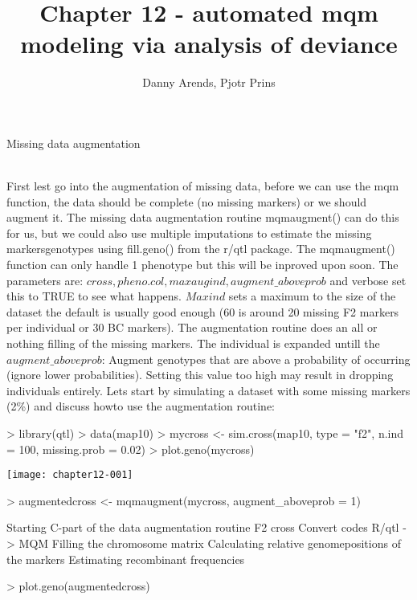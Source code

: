 \documentclass[a4paper]{article}
\title { Chapter 12 - automated mqm modeling via analysis of deviance }
\author { Danny Arends, Pjotr Prins }
\begin{document}
\maketitle
\clearpage
\begin{Large} Missing data augmentation \end{Large}\\
First lest go into the augmentation of missing data, before we can use the mqm function, the data should be complete (no missing markers)
or we should augment it. The missing data augmentation routine mqmaugment() can do this for us, but we could also use multiple imputations
to estimate the missing markersgenotypes using fill.geno() from the r/qtl package. The mqmaugment() function can only handle 1 phenotype but this will be inproved upon soon. The parameters are:
$cross, pheno.col, maxaugind, augment\_aboveprob$ and verbose set this to TRUE to see what happens. $Maxind$ sets a maximum to the size of the dataset the default is usually good enough (60 is around 20 missing F2 markers per individual or 30 BC markers). The augmentation routine does an all or nothing filling of the missing markers. The individual is expanded untill the $augment\_aboveprob$: Augment genotypes that are above a probability of occurring (ignore lower probabilities). Setting this value too high may result in dropping individuals entirely.
Lets start by simulating a dataset with some missing markers (2\%) and discuss howto use the augmentation routine:
\\
\begin{Schunk}
\begin{Sinput}
> library(qtl)
> data(map10)
> mycross <- sim.cross(map10, type = "f2", n.ind = 100, missing.prob = 0.02)
> plot.geno(mycross)
\end{Sinput}
\end{Schunk}
\texttt{[image: chapter12-001]}
\begin{Schunk}
\begin{Sinput}
> augmentedcross <- mqmaugment(mycross, augment_aboveprob = 1)
\end{Sinput}
\begin{Soutput}
Starting C-part of the data augmentation routine
F2 cross
Convert codes R/qtl -> MQM
Filling the chromosome matrix
Calculating relative genomepositions of the markers
Estimating recombinant frequencies
\end{Soutput}
\begin{Sinput}
> plot.geno(augmentedcross)
\end{Sinput}
\end{Schunk}
\end{document}
